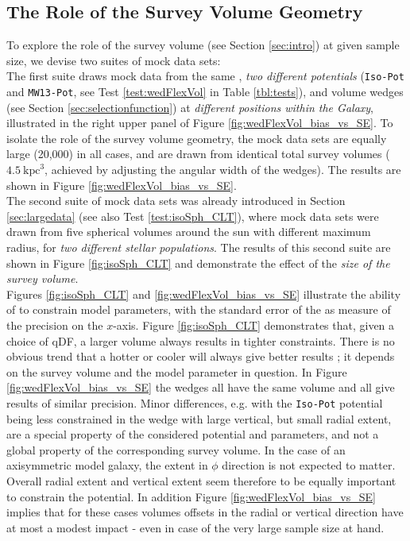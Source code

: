 \subsection{The Role of the Survey Volume Geometry} \label{sec:results_obsvolume}

To explore the role of the survey volume (see Section \ref{sec:intro}) at given sample size, we devise two suites of mock data sets: 
\\The first suite draws mock data from the same \pmodel{}, {\it two different potentials} (\texttt{Iso-Pot} and \texttt{MW13-Pot}, see Test \ref{test:wedFlexVol} in Table \ref{tbl:tests}), and volume wedges (see Section \ref{sec:selectionfunction}) at {\it different positions within the Galaxy}, illustrated in the right upper panel of Figure \ref{fig:wedFlexVol_bias_vs_SE}. To isolate the role of the survey volume geometry, the mock data sets are equally large (20,000) in all cases, and are drawn from identical total survey volumes ($4.5~\text{kpc}^3$, achieved by adjusting the angular width of the wedges). The results are shown in Figure \ref{fig:wedFlexVol_bias_vs_SE}.
\\The second suite of mock data sets was already introduced in Section \ref{sec:largedata} (see also Test \ref{test:isoSph_CLT}), where mock data sets were drawn from five spherical volumes around the sun with different maximum radius, for {\it two different stellar populations}. The results of this second suite are shown in Figure \ref{fig:isoSph_CLT} and demonstrate the effect of the {\it size of the survey volume}.
\\Figures \ref{fig:isoSph_CLT} and \ref{fig:wedFlexVol_bias_vs_SE} illustrate the ability of \RM{} to constrain model parameters, with the standard error of the \pdf{} as measure of the precision on the $x$-axis. Figure \ref{fig:isoSph_CLT} demonstrates that, given a choice of qDF, a larger volume always results in tighter constraints. There is no obvious trend that a hotter or cooler \MAP{} will always give better results ; it depends on the survey volume and the model parameter in question. In Figure \ref{fig:wedFlexVol_bias_vs_SE} the wedges all have the same volume and all give results of similar precision. Minor differences, e.g. with the \texttt{Iso-Pot} potential being less constrained in the wedge with large vertical, but small radial extent, are a special property of the considered potential and parameters, and not a global property of the corresponding survey volume. In the case of an axisymmetric model galaxy, the extent in $\phi$ direction is not expected to matter. Overall radial extent and vertical extent seem therefore to be equally important to constrain the potential. In addition Figure \ref{fig:wedFlexVol_bias_vs_SE} implies that for these cases volumes offsets in the radial or vertical direction have at most a modest impact - even in case of the very large sample size at hand.
